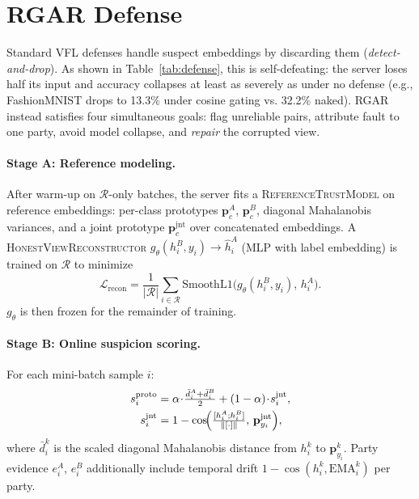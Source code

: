 \documentclass{article}
\begin{document}
\section{RGAR Defense}
\label{sec:rgar}

Standard VFL defenses handle suspect embeddings by discarding them
(\emph{detect-and-drop}).
As shown in Table~\ref{tab:defense}, this is self-defeating: the server
loses half its input and accuracy collapses at least as severely as
under no defense (e.g., FashionMNIST drops to 13.3\% under cosine
gating vs. 32.2\% naked).
RGAR instead satisfies four simultaneous goals: flag unreliable pairs,
attribute fault to one party, avoid model collapse, and \emph{repair} the
corrupted view.

\paragraph{Stage A: Reference modeling.}
After warm-up on $\mathcal{R}$-only batches, the server fits a
\textsc{ReferenceTrustModel} on reference embeddings:
per-class prototypes $\mathbf{p}^A_c$, $\mathbf{p}^B_c$, diagonal
Mahalanobis variances, and a joint prototype $\mathbf{p}^{\mathrm{jnt}}_c$
over concatenated embeddings.
A \textsc{HonestViewReconstructor} $g_\theta(h^B_i,y_i)\!\to\!\hat{h}^A_i$
(MLP with label embedding) is trained on $\mathcal{R}$ to minimize
\begin{equation}
  \mathcal{L}_{\mathrm{recon}}
  = \frac{1}{|\mathcal{R}|}\sum_{i\in\mathcal{R}}
    \mathrm{SmoothL1}\!\bigl(g_\theta(h^B_i,y_i),\,h^A_i\bigr).
  \label{eq:recon_loss}
\end{equation}
$g_\theta$ is then frozen for the remainder of training.

\paragraph{Stage B: Online suspicion scoring.}
For each mini-batch sample $i$:
\begin{align}
  s^{\mathrm{proto}}_i
    &= \alpha\!\cdot\!\tfrac{\bar{d}^A_i + \bar{d}^B_i}{2}
       + (1-\alpha)\!\cdot\!s^{\mathrm{jnt}}_i,
  \label{eq:pair_score}\\
  s^{\mathrm{jnt}}_i
    &= 1 - \cos\!\Bigl(\tfrac{[h^A_i;h^B_i]}{\|[\cdot]\|},\,
                        \mathbf{p}^{\mathrm{jnt}}_{y_i}\Bigr),
  \label{eq:joint_score}
\end{align}
where $\bar{d}^k_i$ is the scaled diagonal Mahalanobis distance from
$h^k_i$ to $\mathbf{p}^k_{y_i}$.
Party evidence $e^A_i$, $e^B_i$ additionally include temporal drift
$1-\cos(h^k_i, \mathrm{EMA}^k_i)$ per party.
\end{document}
